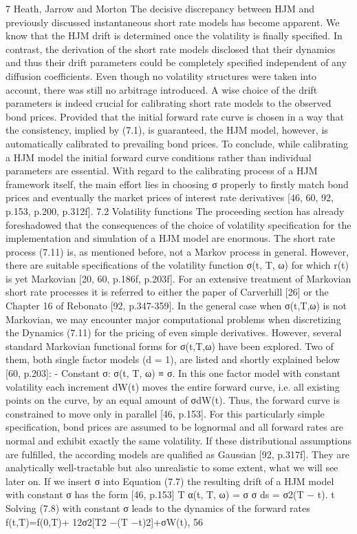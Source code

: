 7 Heath, Jarrow and Morton
The decisive discrepancy between HJM and previously discussed instantaneous short rate models has become apparent. We know that the HJM drift is determined once the volatility is finally specified. In contrast, the derivation of the short rate models disclosed that their dynamics and thus their drift parameters could be completely specified independent of any diffusion coefficients. Even though no volatility structures were taken into account, there was still no arbitrage introduced. A wise choice of the drift parameters is indeed crucial for calibrating short rate models to the observed bond prices. Provided that the initial forward rate curve is chosen in a way that the consistency, implied by (7.1), is guaranteed, the HJM model, however, is automatically calibrated to prevailing bond prices. To conclude, while calibrating a HJM model the initial forward curve conditions rather than individual parameters are essential. With regard to the calibrating process of a HJM framework itself, the main effort lies in choosing σ properly to firstly match bond prices and eventually the market prices of interest rate derivatives [46, 60, 92, p.153, p.200, p.312f].
7.2 Volatility functions
The proceeding section has already foreshadowed that the consequences of the choice of volatility specification for the implementation and simulation of a HJM model are enormous. The short rate process (7.11) is, as mentioned before, not a Markov process in general. However, there are suitable specifications of the volatility function σ(t, T, ω) for which r(t) is yet Markovian [20, 60, p.186f, p.203f]. For an extensive treatment of Markovian short rate processes it is referred to either the paper of Carverhill [26] or the Chapter 16 of Rebonato [92, p.347-359]. In the general case when σ(t,T,ω) is not Markovian, we may encounter major computational problems when discretizing the Dynamics (7.11) for the pricing of even simple derivatives. However, several standard Markovian functional forms for σ(t,T,ω) have been explored. Two of them, both single factor models (d = 1), are listed and shortly explained below [60, p.203]:
- Constant σ: σ(t, T, ω) ≡ σ.
In this one factor model with constant volatility each increment dW(t) moves the entire forward curve, i.e. all existing points on the curve, by an equal amount of σdW(t). Thus, the forward curve is constrained to move only in parallel [46, p.153]. For this particularly simple specification, bond prices are assumed to be lognormal and all forward rates are normal and exhibit exactly the same volatility. If these distributional assumptions are fulfilled, the according models are qualified as Gaussian [92, p.317f]. They are analytically well-tractable but also unrealistic to some extent, what we will see later on. If we insert σ into Equation (7.7) the resulting drift of a HJM model with constant σ has the form [46, p.153]
T
α(t, T, ω) = σ σ ds = σ2(T − t).
t
Solving (7.8) with constant σ leads to the dynamics of the forward rates f(t,T)=f(0,T)+ 12σ2[T2 −(T −t)2]+σW(t),
56

